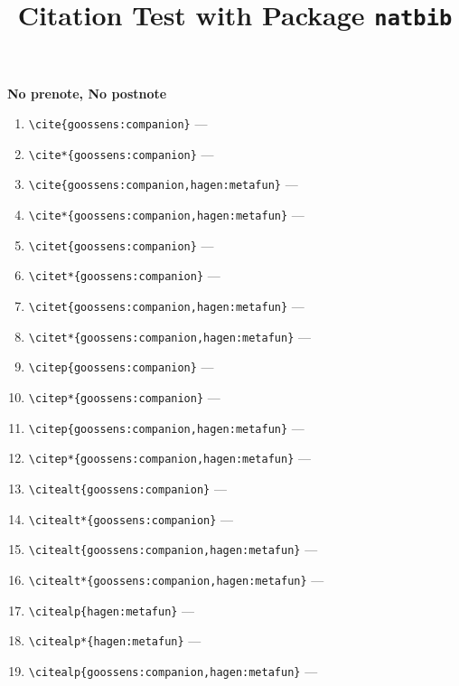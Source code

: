 \documentclass[12pt]{article}
\begin{document}
\title{Citation Test with Package \texttt{natbib}}

\textbf{No prenote, No postnote}

\begin{enumerate}
\item
\verb|\cite{goossens:companion}| ---
\cite{goossens:companion}
\item
\verb|\cite*{goossens:companion}| ---
\cite*{goossens:companion}
\item
\verb|\cite{goossens:companion,hagen:metafun}| ---
\cite{goossens:companion,hagen:metafun}
\item
\verb|\cite*{goossens:companion,hagen:metafun}| ---
\cite*{goossens:companion,hagen:metafun}
\item
\verb|\citet{goossens:companion}| ---
\citet{goossens:companion}
\item
\verb|\citet*{goossens:companion}| ---
\citet*{goossens:companion}
\item
\verb|\citet{goossens:companion,hagen:metafun}| ---
\citet{goossens:companion,hagen:metafun}
\item
\verb|\citet*{goossens:companion,hagen:metafun}| ---
\citet*{goossens:companion,hagen:metafun}
\item
\verb|\citep{goossens:companion}| ---
\citep{goossens:companion}
\item
\verb|\citep*{goossens:companion}| ---
\citep*{goossens:companion}
\item
\verb|\citep{goossens:companion,hagen:metafun}| ---
\citep{goossens:companion,hagen:metafun}
\item
\verb|\citep*{goossens:companion,hagen:metafun}| ---
\citep*{goossens:companion,hagen:metafun}
\item
\verb|\citealt{goossens:companion}| ---
\citealt{goossens:companion}
\item
\verb|\citealt*{goossens:companion}| ---
\citealt*{goossens:companion}
\item
\verb|\citealt{goossens:companion,hagen:metafun}| ---
\citealt{goossens:companion,hagen:metafun}
\item
\verb|\citealt*{goossens:companion,hagen:metafun}| ---
\citealt*{goossens:companion,hagen:metafun}
\item
\verb|\citealp{hagen:metafun}| ---
\citealp{hagen:metafun}
\item
\verb|\citealp*{hagen:metafun}| ---
\citealp*{hagen:metafun}
\item
\verb|\citealp{goossens:companion,hagen:metafun}| ---
\citealp{goossens:companion,hagen:metafun}

\end{enumerate}
\end{document}
